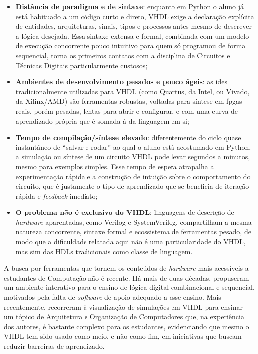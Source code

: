 \begin{itemize}
    \item \textbf{Distância de paradigma e de sintaxe}: enquanto em Python o aluno já está habituado a um código curto e direto, VHDL exige a declaração explícita de entidades, arquiteturas, sinais, tipos e processos antes mesmo de descrever a lógica desejada. Essa sintaxe extensa e formal, combinada com um modelo de execução concorrente pouco intuitivo para quem só programou de forma sequencial, torna os primeiros contatos com a disciplina de Circuitos e Técnicas Digitais particularmente custosos;
    \item \textbf{Ambientes de desenvolvimento pesados e pouco ágeis}: as \glspl{ide} tradicionalmente utilizadas para VHDL (como Quartus, da Intel, ou Vivado, da Xilinx/AMD) são ferramentas robustas, voltadas para síntese em \glspl{fpga} reais, porém pesadas, lentas para abrir e configurar, e com uma curva de aprendizado própria que é somada à da linguagem em si;
    \item \textbf{Tempo de compilação/síntese elevado}: diferentemente do ciclo quase instantâneo de ``salvar e rodar'' ao qual o aluno está acostumado em Python, a simulação ou síntese de um circuito VHDL pode levar segundos a minutos, mesmo para exemplos simples. Esse tempo de espera atrapalha a experimentação rápida e a construção de intuição sobre o comportamento do circuito, que é justamente o tipo de aprendizado que se beneficia de iteração rápida e \textit{feedback} imediato;
    \item \textbf{O problema não é exclusivo do VHDL}: linguagens de descrição de \textit{hardware} aparentadas, como Verilog e SystemVerilog, compartilham a mesma natureza concorrente, sintaxe formal e ecossistema de ferramentas pesado, de modo que a dificuldade relatada aqui não é uma particularidade do VHDL, mas sim das HDLs tradicionais como classe de linguagem.
\end{itemize}

A busca por ferramentas que tornem os conteúdos de \textit{hardware} mais acessíveis a estudantes de Computação não é recente. Há mais de duas décadas,  propuseram um ambiente interativo para o ensino de lógica digital combinacional e sequencial, motivados pela falta de \textit{software} de apoio adequado a esse ensino. Mais recentemente,  recorreram à visualização de simulações em VHDL para ensinar um tópico de Arquitetura e Organização de Computadores que, na experiência dos autores, é bastante complexo para os estudantes, evidenciando que mesmo o VHDL tem sido usado como meio, e não como fim, em iniciativas que buscam reduzir barreiras de aprendizado.


